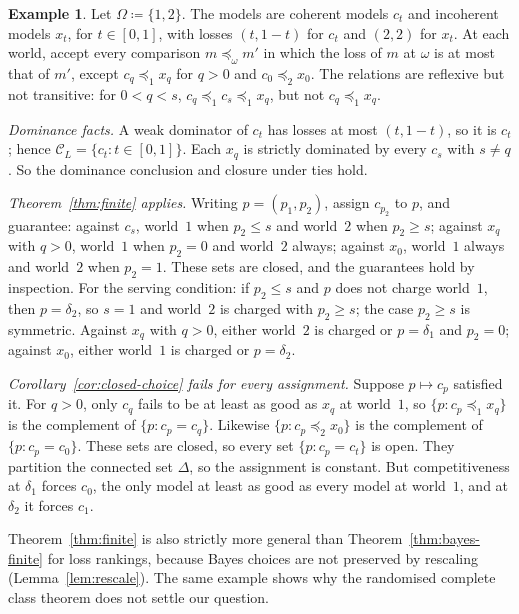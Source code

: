 \documentclass[11pt]{article}
\theoremstyle{definition}
\newtheorem{example}[theorem]{Example}
\theoremstyle{remark}
\newcommand{\C}{\mathcal C}
\begin{document}
\begin{example}\label{ex:two-world}
Let $\Omega\coloneqq\{1,2\}$. The models are coherent models $c_t$ and incoherent models $x_t$, for $t\in[0,1]$, with losses $(t,1-t)$ for $c_t$ and $(2,2)$ for $x_t$. At each world, accept every comparison $m\preceq_\omega m'$ in which the loss of $m$ at $\omega$ is at most that of $m'$, except $c_q\preceq_1x_q$ for $q>0$ and $c_0\preceq_2x_0$. The relations are reflexive but not transitive: for $0<q<s$, $c_q\preceq_1c_s\preceq_1x_q$, but not $c_q\preceq_1x_q$.

\emph{Dominance facts.} A weak dominator of $c_t$ has losses at most $(t,1-t)$, so it is $c_t$; hence $\C_L=\{c_t:t\in[0,1]\}$. Each $x_q$ is strictly dominated by every $c_s$ with $s\ne q$. So the dominance conclusion and closure under ties hold.

\emph{Theorem~\ref{thm:finite} applies.} Writing $p=(p_1,p_2)$, assign $c_{p_2}$ to $p$, and guarantee: against $c_s$, world~$1$ when $p_2\le s$ and world~$2$ when $p_2\ge s$; against $x_q$ with $q>0$, world~$1$ when $p_2=0$ and world~$2$ always; against $x_0$, world~$1$ always and world~$2$ when $p_2=1$. These sets are closed, and the guarantees hold by inspection. For the serving condition: if $p_2\le s$ and $p$ does not charge world~$1$, then $p=\delta_2$, so $s=1$ and world~$2$ is charged with $p_2\ge s$; the case $p_2\ge s$ is symmetric. Against $x_q$ with $q>0$, either world~$2$ is charged or $p=\delta_1$ and $p_2=0$; against $x_0$, either world~$1$ is charged or $p=\delta_2$.

\emph{Corollary~\ref{cor:closed-choice} fails for every assignment.} Suppose $p\mapsto c_p$ satisfied it. For $q>0$, only $c_q$ fails to be at least as good as $x_q$ at world~$1$, so $\{p:c_p\preceq_1x_q\}$ is the complement of $\{p:c_p=c_q\}$. Likewise $\{p:c_p\preceq_2x_0\}$ is the complement of $\{p:c_p=c_0\}$. These sets are closed, so every set $\{p:c_p=c_t\}$ is open. They partition the connected set $\Delta$, so the assignment is constant. But competitiveness at $\delta_1$ forces $c_0$, the only model at least as good as every model at world~$1$, and at $\delta_2$ it forces $c_1$.
\end{example}

Theorem~\ref{thm:finite} is also strictly more general than Theorem~\ref{thm:bayes-finite} for loss rankings, because Bayes choices are not preserved by rescaling (Lemma~\ref{lem:rescale}). The same example shows why the randomised complete class theorem does not settle our question.
\end{document}
